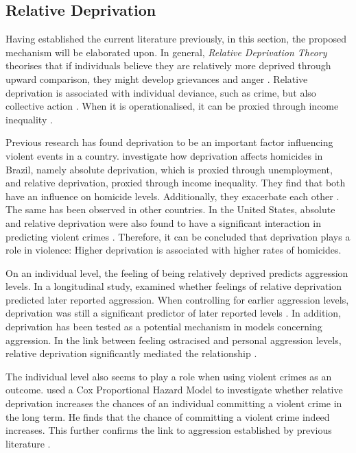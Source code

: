 \documentclass[stu,12pt]{apa7}
\begin{document}
\subsection{Relative Deprivation}

Having established the current literature previously, in this section, the proposed mechanism will be elaborated upon. In general, \textit{Relative Deprivation Theory} theorises that if individuals believe they are relatively more deprived through upward comparison, they might develop grievances and anger \parencite{smithRelativeDeprivationTheory2020}. Relative deprivation is associated with individual deviance, such as crime, but also collective action \parencite{smithRelativeDeprivationTheory2020}. When it is operationalised, it can be proxied through income inequality \parencite{aransiolaEffectAbsoluteRelative2021}.

Previous research has found deprivation to be an important factor influencing violent events in a country. \textcite{aransiolaEffectAbsoluteRelative2021} investigate how deprivation affects homicides in Brazil, namely absolute deprivation, which is proxied through unemployment, and relative deprivation, proxied through income inequality. They find that both have an influence on homicide levels. Additionally, they exacerbate each other \parencite{aransiolaEffectAbsoluteRelative2021}. The same has been observed in other countries. In the United States, absolute and relative deprivation were also found to have a significant interaction in predicting violent crimes \parencite{burrastonRelativeAbsoluteDeprivations2018}. Therefore, it can be concluded that deprivation plays a role in violence: Higher deprivation is associated with higher rates of homicides.

On an individual level, the feeling of being relatively deprived predicts aggression levels. In a longitudinal study, \textcite{greitemeyerImpactPersonalRelative2019} examined whether feelings of relative deprivation predicted later reported aggression. When controlling for earlier aggression levels, deprivation was still a significant predictor of later reported levels \parencite{greitemeyerImpactPersonalRelative2019}. In addition, deprivation has been tested as a potential mechanism in models concerning aggression. In the link between feeling ostracised and personal aggression levels, relative deprivation significantly mediated the relationship \parencite{jiangRelativeDeprivationMechanism2020}.

The individual level also seems to play a role when using violent crimes as an outcome. \textcite{itskovichEconomicInequalityRelative2025} used a Cox Proportional Hazard Model to investigate whether relative deprivation increases the chances of an individual committing a violent crime in the long term. He finds that the chance of committing a violent crime indeed increases. This further confirms the link to aggression established by previous literature \parencite{itskovichEconomicInequalityRelative2025, greitemeyerImpactPersonalRelative2019, jiangRelativeDeprivationMechanism2020}.
\end{document}
